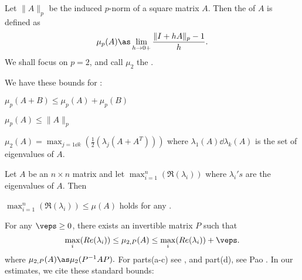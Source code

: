  
 







	Let $\|A\|_p$ be the induced $p$-norm of a square matrix $A$.
	Then the  of $A$ is defined as
		\[\mu_p(A) \as \lim_{h\to 0+}\frac{\|I+hA\|_p-1}{h}.\]
	We shall focus on $p=2$, and call $\mu_2$ the \lognorm.
	
	
	We have these bounds for \lognorm:
	\bleml[lognorm] \ 
	\benum[(a)]
	\item
		$\mu_p(A+B)\le \mu_p(A)+\mu_p(B)$
	\item
		$\mu_p(A)\le \|A\|_p$
	\item
		$\mu_2(A)=\max_{j=1\dd k}(\frac{1}{2}(\lambda_{j} (A+A^T)))$
			where $\lambda_1(A)\dd \lambda_k(A)$
			is the set of eigenvalues of $A$.
	\item
		Let $A$ be an $n\times n$ matrix  and let
		$\max_{i=1}^n (\Re(\lambda_i))$ where
		$\lambda_i's$ are the eigenvalues of $A$.
		Then
		\bitem
			\item $\max_{i=1}^n (\Re(\lambda_i))\le
					\mu(A)$ holds for any \lognorm.
			\item For any $\veps \ge 0$, there exists an
				invertible matrix $P$ such that 
			\[\max_i(Re(\lambda_i))\le \mu_{2,P}(A)\le
				\max_i(Re(\lambda_i))+\veps.\]
			where $\mu_{2,P}(A)\as \mu_2(P^{-1}AP).$
		\eitem
	\eenum
	\eleml
	For parts(a-c) see
		\cite{desoer-haneda:measure:72},
	and part(d), see
		Pao \cite{pao:log-der-matrix:73}.
	In our estimates, we cite these standard bounds:
	\eeql

